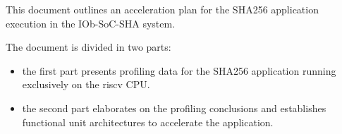 This document outlines an acceleration plan for the SHA256 application
execution in the IOb-SoC-SHA system.

The document is divided in two parts: 
\begin{itemize}

\item the first part presents profiling data for the SHA256 application running
exclusively on the riscv CPU.

\item the second part elaborates on the profiling conclusions and establishes
functional unit architectures to accelerate the application.

\end{itemize}










